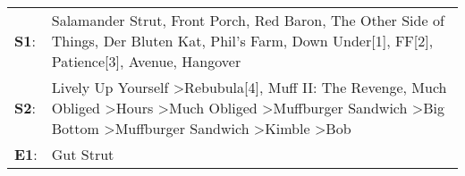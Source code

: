 \begin{supertabular}{p{0.03\textwidth}p{0.92\textwidth}}
 \textbf{S1}:  &                                                                                                         Salamander Strut\textsuperscript{}, \enspace Front Porch\textsuperscript{}, \enspace Red Baron\textsuperscript{}, \enspace The Other Side of Things\textsuperscript{}, \enspace Der Bluten Kat\textsuperscript{}, \enspace Phil's Farm\textsuperscript{}, \enspace Down Under[1]\textsuperscript{}, \enspace FF[2]\textsuperscript{}, \enspace Patience[3]\textsuperscript{}, \enspace Avenue\textsuperscript{}, \enspace Hangover\textsuperscript{}  \enspace  \\
 \textbf{S2}:  &  Lively Up Yourself\textsuperscript{} \textgreater \enspace Rebubula[4]\textsuperscript{}, \enspace Muff II: The Revenge\textsuperscript{}, \enspace Much Obliged\textsuperscript{} \textgreater \enspace Hours\textsuperscript{} \textgreater \enspace Much Obliged\textsuperscript{} \textgreater \enspace Muffburger Sandwich\textsuperscript{} \textgreater \enspace Big Bottom\textsuperscript{} \textgreater \enspace Muffburger Sandwich\textsuperscript{} \textgreater \enspace Kimble\textsuperscript{} \textgreater \enspace Bob\textsuperscript{}  \enspace  \\
 \textbf{E1}:  &                                                                                                                                                                                                                                                                                                                                                                                                                                                                                                                                  Gut Strut\textsuperscript{}  \enspace  \\
\end{supertabular}

